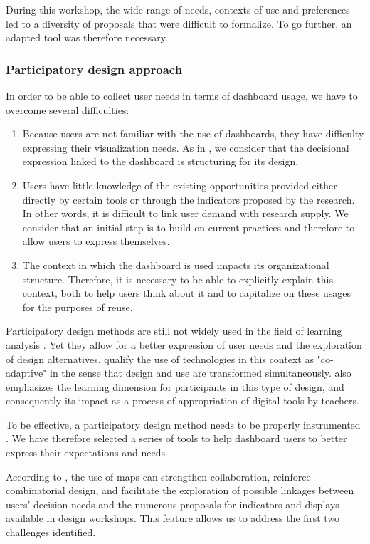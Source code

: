 \documentclass[preprint,12pt]{elsarticle}
\begin{document}
During this workshop, the wide range of needs, contexts of use and preferences led to a diversity of proposals that were difficult to formalize. To go further, an adapted tool was therefore necessary.


\subsubsection{Participatory design approach}
In order to be able to collect user needs in terms of dashboard usage, we have to overcome several difficulties:
\begin{enumerate}
    \item Because users are not familiar with the use of dashboards, they have difficulty expressing their visualization needs. As in \citet{xhakaj2017effects}, we consider that the decisional expression linked to the dashboard is structuring for its design.
    \item Users have little knowledge of the existing opportunities provided either directly by certain tools or through the indicators proposed by the research. In other words, it is difficult to link user demand with research supply. We consider that an initial step is to build on current practices and therefore to allow users to express themselves.
    \item The context in which the dashboard is used impacts its organizational structure. Therefore, it is necessary to be able to explicitly explain this context, both to help users think about it and to capitalize on these usages for the purposes of reuse.
\end{enumerate}

Participatory design methods are still not widely used in the field of learning analysis \cite{abel2013cross}. Yet they allow for a better expression of user needs and the exploration of design alternatives. \citet{mackay1997radicalement} qualify the use of technologies in this context as "co-adaptive" in the sense that design and use are transformed simultaneously. \citet{knibbe2016} also emphasizes the learning dimension for participants in this type of design, and consequently its impact as a process of appropriation of digital tools by teachers.

To be effective, a participatory design method needs to be properly instrumented \cite{sanders2010framework}. We have therefore selected a series of tools to help dashboard users to better express their expectations and needs.

According to \citet{lucero2016designing}, the use of maps can strengthen collaboration, reinforce combinatorial design, and facilitate the exploration of possible linkages between users' decision needs and the numerous proposals for indicators and displays available in design workshops. This feature allows us to address the first two challenges identified.
\end{document}
